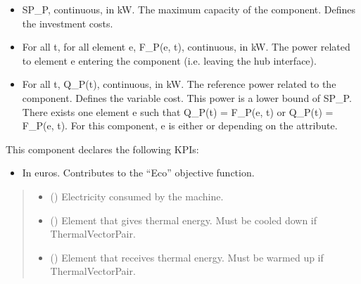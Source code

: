 \documentclass[letterpaper,10pt,english]{sphinxmanual}
\begin{document}
\begin{fulllineitems}
\begin{fulllineitems}
\begin{itemize}
\item {} 
\sphinxAtStartPar
SP\_P, continuous, in kW.
The maximum capacity of the component. Defines the investment costs.

\item {} 
\sphinxAtStartPar
For all t, for all element e, F\_P(e, t), continuous, in kW.
The power related to element e entering the component (i.e. leaving the hub interface).

\item {} 
\sphinxAtStartPar
For all t, Q\_P(t), continuous, in kW.
The reference power related to the component. Defines the variable cost.
This power is a lower bound of SP\_P.
There exists one element e such that Q\_P(t) = F\_P(e, t) or Q\_P(t) = \sphinxhyphen{} F\_P(e, t).
For this component, e is either  or  depending on the  attribute.

\end{itemize}

\sphinxAtStartPar
This component declares the following KPIs:
\begin{itemize}
\item {} 
\sphinxAtStartPar
{}
In euros.
Contributes to the “Eco” objective function.

\end{itemize}
\begin{quote}\begin{description}
\begin{itemize}
\item {} 
\sphinxAtStartPar
{} ({\hyperref[\detokenize{generated/tamos.element.ElectricityVector:tamos.element.ElectricityVector}]{}}) \textendash{} Electricity consumed by the machine.

\item {} 
\sphinxAtStartPar
{} () \textendash{} Element that gives thermal energy.
Must be cooled down if ThermalVectorPair.

\item {} 
\sphinxAtStartPar
{} () \textendash{} Element that receives thermal energy.
Must be warmed up if ThermalVectorPair.


\end{itemize}
\end{description}
\end{quote}
\end{fulllineitems}
\end{fulllineitems}
\end{document}
